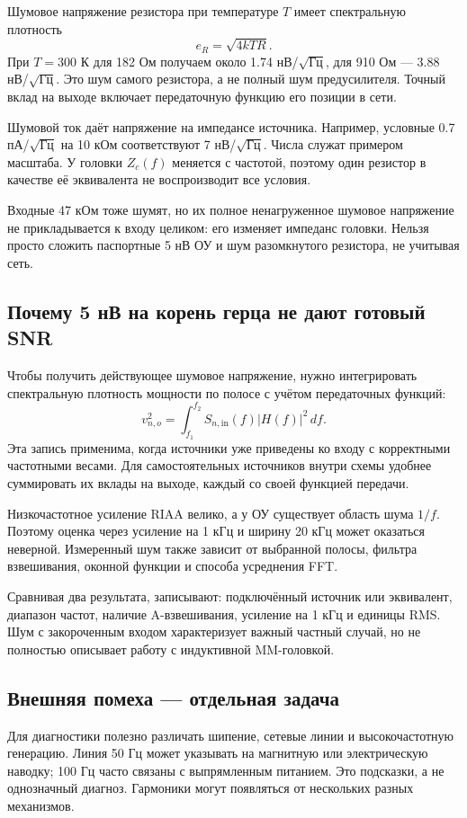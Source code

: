 \documentclass[a4paper,11pt]{article}
\begin{document}
Шумовое напряжение резистора при температуре $T$ имеет спектральную плотность
\[
 e_R=\sqrt{4kTR}.
\]
При $T=300$ К для 182 Ом получаем около 1.74 нВ/$\sqrt{\text{Гц}}$,
для 910 Ом — 3.88 нВ/$\sqrt{\text{Гц}}$.
Это шум самого резистора, а не полный шум предусилителя. Точный вклад на выходе
включает передаточную функцию его позиции в сети.

Шумовой ток даёт напряжение на импедансе источника. Например, условные
0.7 пА/$\sqrt{\text{Гц}}$ на 10 кОм соответствуют 7 нВ/$\sqrt{\text{Гц}}$.
Числа служат примером масштаба. У головки $Z_c(f)$ меняется с частотой,
поэтому один резистор в качестве её эквивалента не воспроизводит все условия.

Входные 47 кОм тоже шумят, но их полное ненагруженное шумовое напряжение
не прикладывается к входу целиком: его изменяет импеданс головки.
Нельзя просто сложить паспортные 5 нВ ОУ и шум разомкнутого резистора,
не учитывая сеть.

\subsection{Почему 5 нВ на корень герца не дают готовый SNR}

Чтобы получить действующее шумовое напряжение, нужно интегрировать
спектральную плотность мощности по полосе с учётом передаточных функций:
\[
 v_{n,o}^2=\int_{f_1}^{f_2}S_{n,\mathrm{in}}(f)|H(f)|^2\,df.
\]
Эта запись применима, когда источники уже приведены ко входу с корректными
частотными весами. Для самостоятельных источников внутри схемы удобнее
суммировать их вклады на выходе, каждый со своей функцией передачи.

Низкочастотное усиление RIAA велико, а у ОУ существует область шума $1/f$.
Поэтому оценка через усиление на 1 кГц и ширину 20 кГц может оказаться неверной.
Измеренный шум также зависит от выбранной полосы, фильтра взвешивания,
оконной функции и способа усреднения FFT.

Сравнивая два результата, записывают: подключённый источник или эквивалент,
диапазон частот, наличие A-взвешивания, усиление на 1 кГц и единицы RMS.
Шум с закороченным входом характеризует важный частный случай, но не полностью
описывает работу с индуктивной MM-головкой.

\subsection{Внешняя помеха — отдельная задача}

Для диагностики полезно различать шипение, сетевые линии и высокочастотную
генерацию. Линия 50 Гц может указывать на магнитную или электрическую наводку;
100 Гц часто связаны с выпрямленным питанием. Это подсказки, а не однозначный
диагноз. Гармоники могут появляться от нескольких разных механизмов.
\end{document}
